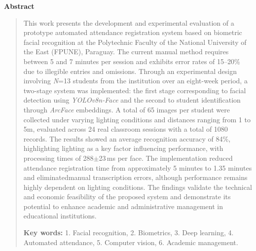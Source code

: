 \thispagestyle{empty}
\begin{center}
\begin{LARGE}
\textbf{Abstract}
\end{LARGE}
\end{center}
\begin{quotation}
\sloppy

This work presents the development and experimental evaluation of a prototype automated attendance registration system based on biometric facial recognition at the Polytechnic Faculty of the National University of the East (FPUNE), Paraguay. The current manual method requires between 5 and 7 minutes per session and exhibits error rates of 15–20\% due to illegible entries and omissions. Through an experimental design involving \textit{N}=13 students from the institution over an eight-week period, a two-stage system was implemented: the first stage corresponding to facial detection using \textit{YOLOv8n-Face}  and the second to student identification through \textit{ArcFace} embeddings. A total of 65 images per student were collected under varying lighting conditions and distances ranging from 1 to 5m, evaluated across 24 real classroom sessions with a total of 1080 records. The results showed an average recognition accuracy of 84\%, highlighting lighting as a key factor influencing performance, with processing times of 288$\pm$23\,ms per face. The implementation reduced attendance registration time from approximately 5 minutes to 1.35 minutes and eliminatedmanual transcription errors, although performance remains highly dependent on lighting conditions. The findings validate the technical and economic feasibility of the proposed system and demonstrate its potential to enhance academic and administrative management in educational institutions.

\vspace*{0.5cm}
\noindent \textbf{Key words:} 1. Facial recognition, 2. Biometrics, 3. Deep learning, 4. Automated attendance, 5. Computer vision, 6. Academic management.

\end{quotation}
